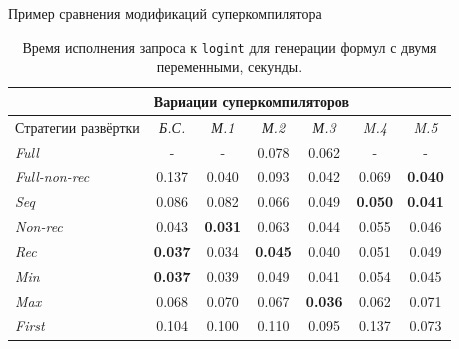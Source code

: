\documentclass[xcolor=table]{beamer}
\begin{document}
\begin{frame}{Пример сравнения модификаций суперкомпилятора}
\begin{table}[h!]
\center
\begin{tabular}{|p{2.3cm}||c|c|c|c|c|c|}
\hline
                 & \multicolumn{6}{|l|}{Вариации суперкомпиляторов} \\ \hline
Стратегии развёртки &{\it Б.С.}&{\it М.1}&{\it М.2}&{\it М.3}&{\it M.4}&{\it M.5} \\ \hline \hline
{\it Full        }&    -        &    -        & 0.078       & 0.062      &    -        & - \\ \hline
{\it Full-non-rec}& 0.137       & 0.040       & 0.093       & 0.042      & 0.069       & {\bf 0.040} \\ \hline
{\it Seq         }& 0.086       & 0.082       & 0.066       & 0.049      & {\bf 0.050} & {\bf 0.041} \\ \hline
{\it Non-rec     }& 0.043       & {\bf 0.031} & 0.063       & 0.044      & 0.055       & 0.046 \\ \hline
{\it Rec         }& {\bf 0.037} & 0.034       & {\bf 0.045} & 0.040      & 0.051       & 0.049 \\ \hline
{\it Min         }& {\bf 0.037} & 0.039       & 0.049       & 0.041      & 0.054       & 0.045 \\ \hline
{\it Max         }& 0.068       & 0.070       & 0.067       &{\bf 0.036} & 0.062       & 0.071 \\ \hline
{\it First       }& 0.104       & 0.100       & 0.110       & 0.095      & 0.137       & 0.073 \\ \hline
\end{tabular}
\caption{Время исполнения запроса к \lstinline{logint} для генерации формул с двумя переменными, секунды.}
\label{fig:logintTest3}
\end{table}
\end{frame}
\end{document}
